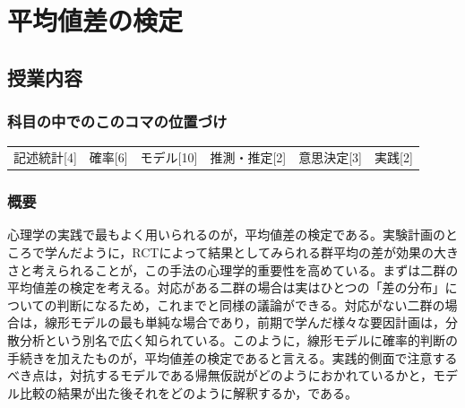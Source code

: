 \section{平均値差の検定}
\label{D1_lesson19}

\subsection{授業内容}
\subsubsection{科目の中でのこのコマの位置づけ}
\begin{tabular}[t]{cccccc}
    記述統計[4] & 確率[6] & モデル[10] & 推測・推定[2] & 意思決定[3] & 実践[2]
\end{tabular}

\subsubsection{概要}
心理学の実践で最もよく用いられるのが，平均値差の検定である。実験計画のところで学んだように，RCTによって結果としてみられる群平均の差が効果の大きさと考えられることが，この手法の心理学的重要性を高めている。まずは二群の平均値差の検定を考える。対応がある二群の場合は実はひとつの「差の分布」についての判断になるため，これまでと同様の議論ができる。対応がない二群の場合は，線形モデルの最も単純な場合であり，前期で学んだ様々な要因計画は，分散分析という別名で広く知られている。このように，線形モデルに確率的判断の手続きを加えたものが，平均値差の検定であると言える。実践的側面で注意するべき点は，対抗するモデルである帰無仮説がどのようにおかれているかと，モデル比較の結果が出た後それをどのように解釈するか，である。
